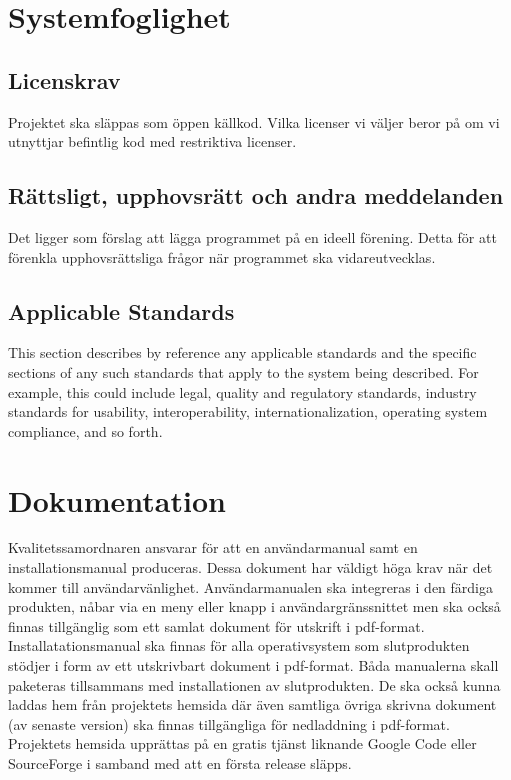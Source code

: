 \section{Systemfoglighet} %

\subsection{Licenskrav}
Projektet ska släppas som öppen källkod. Vilka licenser vi väljer beror på om vi utnyttjar befintlig kod med restriktiva licenser. 

\subsection{Rättsligt, upphovsrätt och andra meddelanden}
Det ligger som förslag att lägga programmet på en ideell förening. Detta för att förenkla upphovsrättsliga frågor när programmet ska vidareutvecklas. 

\subsection{Applicable Standards}
This section describes by reference any applicable standards and the specific sections of any such standards that apply to the system being described. For example, this could include legal, quality and regulatory standards, industry standards for usability, interoperability, internationalization, operating system compliance, and so forth.

\section{Dokumentation}
Kvalitetssamordnaren ansvarar för att en användarmanual samt en installationsmanual produceras. Dessa dokument har väldigt höga krav när det kommer till användarvänlighet. Användarmanualen ska integreras i den färdiga produkten, nåbar via en meny eller knapp i användargränssnittet men ska också finnas tillgänglig som ett samlat dokument för utskrift i pdf-format. Installatationsmanual ska finnas för alla operativsystem som slutprodukten stödjer i form av ett utskrivbart dokument i pdf-format. Båda manualerna skall paketeras tillsammans med installationen av slutprodukten. De ska också kunna laddas hem från projektets hemsida där även samtliga övriga skrivna dokument (av senaste version) ska finnas tillgängliga för nedladdning i pdf-format. Projektets hemsida upprättas på en gratis tjänst liknande Google Code eller SourceForge i samband med att en första release släpps.


